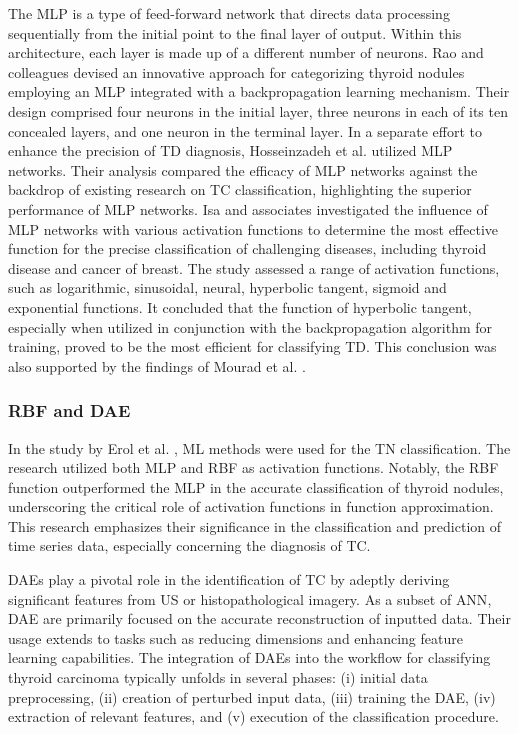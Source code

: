 \documentclass[a4paper,fleqn]{cas-sc}
\begin{document}
The \ac{MLP} is a type of feed-forward network that directs data processing sequentially from the initial point to the final layer of output. Within this architecture, each layer is made up of a different number of neurons. Rao and colleagues \cite{rao2019thyroid} devised an innovative approach for categorizing thyroid nodules employing an \ac{MLP} integrated with a backpropagation learning mechanism. Their design comprised four neurons in the initial layer, three neurons in each of its ten concealed layers, and one neuron in the terminal layer. In a separate effort to enhance the precision of \ac{TD} diagnosis, Hosseinzadeh et al. \cite{hosseinzadeh2020multiple} utilized \ac{MLP} networks. Their analysis compared the efficacy of \ac{MLP} networks against the backdrop of existing research on TC classification, highlighting the superior performance of \ac{MLP} networks. Isa and associates \cite{isa2010suitable} investigated the influence of \ac{MLP} networks with various activation functions to determine the most effective function for the precise classification of challenging diseases, including thyroid disease and cancer of breast. The study assessed a range of activation functions, such as logarithmic, sinusoidal, neural, hyperbolic tangent, sigmoid and exponential functions. It concluded that the function of hyperbolic tangent, especially when utilized in conjunction with the backpropagation algorithm for training, proved to be the most efficient for classifying \ac{TD}. This conclusion was also supported by the findings of Mourad et al. \cite{mourad2020machine}.

\vskip2mm

\subsubsection{RBF and DAE}
In the study by Erol et al. \cite{erol2008radial}, \ac{ML} methods were used for the \ac{TN} classification. The research utilized both \ac{MLP} and \ac{RBF} as activation functions. Notably, the \ac{RBF} function outperformed the \ac{MLP} in the accurate classification of thyroid nodules, underscoring the critical role of activation functions in function approximation. This research emphasizes their significance in the classification and prediction of time series data, especially concerning the diagnosis of TC.


\Acp{DAE} play a pivotal role in the identification of TC by adeptly deriving significant features from \ac{US} or histopathological imagery. As a subset of \ac{ANN}, \ac{DAE} are primarily focused on the accurate reconstruction of inputted data. Their usage extends to tasks such as reducing dimensions and enhancing feature learning capabilities. The integration of \acp{DAE} into the workflow for classifying thyroid carcinoma typically unfolds in several phases: (i) initial data preprocessing, (ii) creation of perturbed input data, (iii) training the \ac{DAE}, (iv) extraction of relevant features, and (v) execution of the classification procedure.
\end{document}
